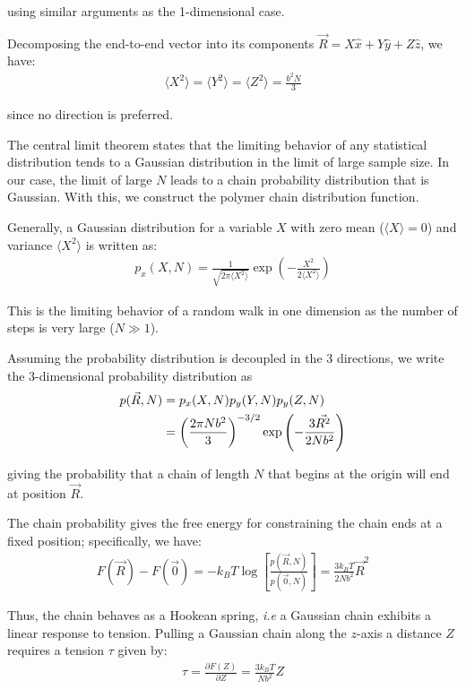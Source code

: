 \documentclass[book.tex]{subfiles}
\begin{document}
\noindent using similar arguments as the 1-dimensional case.

Decomposing the end-to-end vector into its components $\vec{R} = X\hat{x}+ Y\hat{y}+Z\hat{z}$, we have:
\begin{align}\label{Eq6}
\langle X^2 \rangle = \langle Y^2 \rangle = \langle Z^2 \rangle = \frac{b^2N}{3}
\end{align}

\noindent since no direction is preferred.

The central limit theorem states that the limiting behavior of any statistical distribution tends to a Gaussian distribution in the limit of large sample size. In our case, the limit of large $N$ leads to a chain probability distribution that is Gaussian. With this, we construct the polymer chain distribution function.

Generally, a Gaussian distribution for a variable $X$ with zero
mean ($\langle X \rangle = 0$) and variance $\langle X^2 \rangle$
is written as:
\begin{align}\label{Eq7}
p_x(X,N)=\frac{1}{\sqrt{2\pi\langle X^2\rangle}}\exp\left( -\frac{X^2}{2\langle X^2 \rangle} \right)
\end{align}

This is the limiting behavior of a random walk in one dimension
as the number of steps is very large ($N \gg 1$).

Assuming the probability distribution is decoupled in the 3 directions, we write the 3-dimensional probability distribution as
\begin{align}\label{Eq8}
p(\vec{R},N) &= p_x(X,N)p_y(Y,N)p_y(Z,N) \notag\\
&=\left(\frac{2\pi Nb^2}{3}\right)^{-3/2}\exp\left( -\frac{3\vec{R^2}}{2Nb^2} \right)
\end{align}

\noindent giving the probability that a chain of length $N$ that begins at the origin will end at position $\vec{R}$.

The chain probability gives the free energy for constraining the
chain ends at a fixed position; specifically, we have:
\begin{align}\label{Eq9}
F(\vec{R})-F(\vec{0}) = -k_BT\log\left[ \frac{p(\vec{R},N)}{p(\vec{0},N)} \right] = \frac{3k_BT}{2Nb^2}\vec{R}^2
\end{align}

Thus, the chain behaves as a Hookean spring, \textit{i.e} a Gaussian
chain exhibits a linear response to tension. Pulling a Gaussian chain along the $z$-axis a distance $Z$ requires a tension $\tau$ given by:
\begin{align}\label{Eq10}
\tau = \frac{\partial F(Z)}{\partial Z} = \frac{3k_BT}{Nb^2}Z
\end{align}
\end{document}
